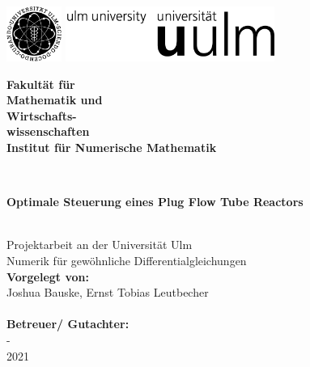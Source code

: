\documentclass[a4paper,12pt,
headsepline,           %
oneside,               %
pointlessnumbers,      %
bibtotoc,              %
BCOR15mm               %
]{scrbook}
\newcommand{\fullname}{Joshua Bauske, Ernst Tobias Leutbecher}
\newcommand{\email}{}
\newcommand{\titel}{Optimale Steuerung eines Plug Flow Tube Reactors}
\newcommand{\jahr}{2021}
\newcommand{\matnr}{}
\newcommand{\gutachterA}{}
\newcommand{\gutachterB}{}
\newcommand{\fakultaet}{Mathematik und\\Wirtschafts-\\wissenschaften}
\newcommand{\institut}{Institut für Numerische Mathematik}
\begin{document}
\frontmatter

\thispagestyle{empty}
\begin{addmargin*}[4mm]{-10mm}

\includegraphics[height=1.8cm]{images/unilogo_bild}
\hfill
\includegraphics[height=1.8cm]{images/unilogo_wort}\\[1em]

{\footnotesize
\hspace*{115mm}\parbox[t]{35mm}{\bfseries Fakultät für\\
\fakultaet\\
\mdseries \institut}\\[2cm]

\parbox{140mm}{\bfseries \LARGE \titel}\\[2.5em]
{\footnotesize Projektarbeit an der Universität Ulm \\Numerik für gewöhnliche Differentialgleichungen}\\[3em]


{\footnotesize \bfseries Vorgelegt von:}\\
{\footnotesize \fullname\\}\\[2em]
{\footnotesize \bfseries Betreuer/ Gutachter:}\\ 
{\footnotesize -}\\[2em]         
{\footnotesize \jahr}
}
\end{addmargin*}
\end{document}
